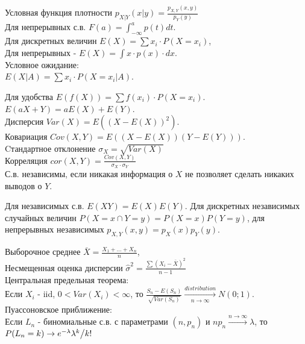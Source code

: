 Условная функция плотности  $p_{X|Y} (x|y)=\frac{p_{X,Y}
(x,y)}{p_{Y} (y)} $ \\
Для непрерывных с.в.  $F(a)=\int _{-\infty }^{a}p(t)dt $. \\


Для дискретных величин  $E(X)=\sum x_{i} \cdot P(X=x_{i} ) $,\\
Для непрерывных - $E(X)=\int x\cdot p(x)\cdot dx $. \\

Условное ожидание: \\
$E(X|A)=\sum x_{i} \cdot P(X=x_{i} |A) $.

Для удобства  $E(f(X))=\sum f(x_{i} )\cdot P(X=x_{i} ) $. \\


$E(aX+Y)=aE(X)+E(Y)$. \\


Дисперсия $Var(X)=E((X-E(X))^{2} )$. \\
Ковариация $Cov(X,Y)=E((X-E(X))(Y-E(Y)))$. \\
Cтандартное отклонение $\sigma _{X} =\sqrt{Var(X)} $ \\
Корреляция $cor(X,Y)=\frac{Cov(X,Y)}{\sigma _{X} \cdot \sigma
_{Y}}$ \\


С.в. независимы, если никакая информация о  $X$  не позволяет
сделать никаких выводов о  $Y$.

Для независимых с.в. $E(XY)=E(X)E(Y)$. Для дискретных независимых
случайных величин  $P(X=x\cap Y=y)=P(X=x)P(Y=y)$, для непрерывных
независимых $p_{X,Y} (x,y)=p_{X} (x)p_{Y} (y)$.

Выборочное среднее  $\bar{X}=\frac{X_{1} +...+X_{n} }{n} $, \\
Несмещенная оценка дисперсии  $\hat{\sigma }^{2} =\frac{\sum
(X_{i} -\bar{X})^{2}  }{n-1} $ \\

Центральная предельная теорема: \\
Если  $X_{i} $  - iid, $0<Var(X_{i} )<\infty $, то $\frac{S_{n}
-E(S_{n} )}{\sqrt{Var(S_{n} )} } \xrightarrow[{n\to \infty
}]{distribution} N(0;1)$. \\
Пуассоновское приближение: \\
Если  $L_{n} $  - биномиальные с.в. с параметрами  $(n,p_{n} )$  и
$np_{n} \stackrel{n\to \infty }{\longrightarrow}\lambda $, то
$P(L_{n} =k)\to e^{-\lambda } {\lambda ^{k} \mathord{\left/
{\vphantom {\lambda ^{k}  k!}} \right. \kern-\nulldelimiterspace}
k!} $ \\





